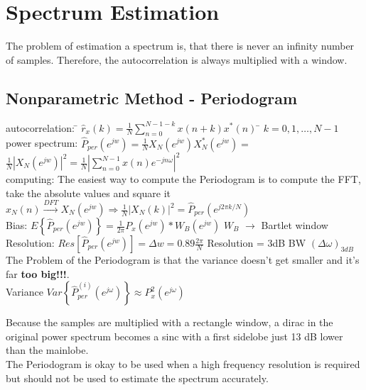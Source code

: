 \section{Spectrum Estimation}
The problem of estimation a spectrum is, that there is never an infinity number of samples. 
Therefore, the autocorrelation is always multiplied with a window.

\subsection{Nonparametric Method - Periodogram }
\begin{tabbing}
autocorrelation: 	\= $\hat{r}_x(k) =\frac{1}{N} \sum \limits_{n=0}^{N-1-k} x(n+k)x^*(n)$   \hspace{4cm} \= $k=0,1,\ldots,N-1$ \\
power spectrum:  	\>  $\hat{P}_{per}(e^{jw}) = \frac{1}{N} X_N(e^{jw})X^*_N(e^{jw}) = $\\
\>					$\frac{1}{N}  \left\lvert X_N(e^{jw}) \right\rvert ^2 =  \frac{1}{N}  \left\lvert \sum\limits_{n=0}^{N-1} x(n)e^{-jn\omega} \right\rvert ^2$   \\
computing:  		\> The easiest way to compute the Periodogram is to compute the FFT, take the absolute values and square it\\
					\> $x_N(n) \xrightarrow{DFT} X_N(e^{jw}) \Rightarrow \frac{1}{N}  \left\lvert X_N(k) \right\rvert ^2 = \hat{P}_{per}(e^{j 2 \pi k/N})$ \\
Bias: 				\>  $E\left\lbrace \hat{P}_{per}(e^{jw}) \right\rbrace = \frac{1}{2 \pi}P_x(e^{jw})*W_B(e^{jw})$ \> $W_B$ $\to$ Bartlet window\\
Resolution: 		\>  $Res[\hat{P}_{per}(e^{jw})] = \Delta w = 0.89 \frac{2 \pi}{N}$\> Resolution = 3dB BW $(\Delta\omega)_{3dB}$\\
The Problem of the Periodogram is that the variance doesn't get smaller and it's far \textbf{too big!!!}.\\
Variance 			\> $Var\left\lbrace \hat{P}_{per}^{(i)}(e^{j\omega}) \right\rbrace \approx P^2_x(e^{j\omega})$\\
\end{tabbing}
Because the samples are multiplied with a rectangle window, a dirac in the original power spectrum becomes a sinc with a first sidelobe just 13 dB lower than the mainlobe.\\
 
 
The Periodogram is okay to be used when a high frequency resolution is required but should
not be used to estimate the spectrum accurately. 
 

